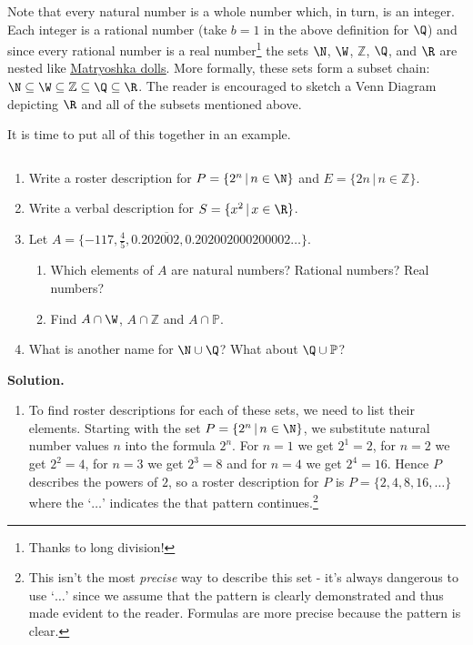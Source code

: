 \medskip

Note that every natural number is a whole number which, in turn, is an integer.   Each integer is a rational number (take $b =1$ in the above definition for $\Q$) and since every rational number is a real number\footnote{Thanks to long division!}  the sets $\N$, $\W$, $\mathbb Z$, $\Q$, and  $\R$ are nested like \href{http://en.wikipedia.org/wiki/Matryoshka_doll}{\underline{Matryoshka dolls}}. More formally, these sets form a subset chain:  $\N \subseteq \W \subseteq \mathbb Z \subseteq \Q \subseteq \R$.  The reader is encouraged to sketch a Venn Diagram depicting $\R$ and all of the subsets mentioned above.  

\smallskip

It is time to put all of this together in an example.

\begin{ex} \label{numbersetex}   $~$

\begin{enumerate}

\item  Write a roster description for $P = \{ 2^{n} \, | \, n \in \N \}$  and $E = \{ 2n \, | \, n \in \mathbb Z \}$.

\item Write a verbal description for $S = \{ x^2 \, | \, x \in \R \}$.

\item Let $A = \{-117, \frac{4}{5}, 0.20\overline{2002}, 0.202002000200002 \ldots\}$. 

\begin{enumerate}

\item Which elements of $A$ are natural numbers?  Rational numbers?  Real numbers?

\item Find $A \cap \W$, $A \cap \mathbb Z$ and $A \cap \mathbb P$.

\end{enumerate}

\item  What is another name for $\N \cup \Q$?  What about  $\Q \cup \mathbb P$?

\end{enumerate}

{\bf Solution.}

\begin{enumerate}

\item  To find roster descriptions for each of these sets, we need to list their elements.   Starting with the set $P = \{ 2^{n} \, | \, n \in \N \}$, we substitute natural number values $n$ into the formula $2^n$.  For $n = 1$ we get $2^1 = 2$,  for $n = 2$ we get $2^2 = 4$, for $n = 3$ we get $2^3 = 8$ and for $n = 4$ we get $2^4 = 16$.  Hence  $P$ describes the powers of $2$, so a roster description for $P$ is $P = \{ 2, 4, 8, 16, \ldots \}$ where the `$\ldots$' indicates the that pattern continues.\footnote{This isn't the most \textit{precise} way to describe this set - it's always dangerous to use `$\ldots$' since we assume that the pattern is clearly demonstrated and thus made evident to the reader.  Formulas are more precise because the pattern is clear.}  


\end{enumerate}
\end{ex}
